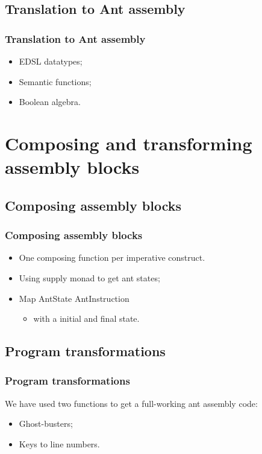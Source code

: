 \documentclass{beamer}
\begin{document}
    \subsection{Translation to Ant assembly}
    \begin{frame}
    \frametitle{Translation to Ant assembly}

            \begin{itemize}
            \item EDSL datatypes;
            \item Semantic functions;
            \item Boolean algebra.
            \end{itemize}
            
    \end{frame}

    \section{Composing and transforming assembly blocks}

    \subsection{Composing assembly blocks}
    \begin{frame}
    \frametitle{Composing assembly blocks}


            \begin{itemize}
            \item One composing function per imperative construct.
            \item Using supply monad to get ant states;
            \item Map AntState AntInstruction
            \begin{itemize} 
                \item with a initial and final state. 
            \end{itemize}
            \end{itemize}

    \end{frame}
   
    \subsection{Program transformations} 
    \begin{frame}
    \frametitle{Program transformations}

            We have used two functions to get a full-working ant assembly code:
            \begin{itemize}
            \item Ghost-busters;
            \item Keys to line numbers. 
            \end{itemize}

    \end{frame}
\end{document}

